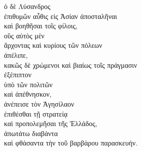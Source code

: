 
{\large
\begin{greek}
\noindent ὁ δὲ Λύσανδρος \\
\tabto{2em} ἐπιθυμῶν αὖθις εἰς Ἀσίαν ἀποσταλῆναι \\
\tabto{4em} καὶ βοηθῆσαι τοῖς φίλοις, \\
\tabto{6em} οὓς αὐτὸς μὲν \\
\tabto{8em} ἄρχοντας καὶ κυρίους τῶν πόλεων \\
\tabto{6em} ἀπέλιπε, \\
\tabto{6em} κακῶς δὲ χρώμενοι καὶ βιαίως τοῖς πράγμασιν \\
\tabto{6em} ἐξέπιπτον \\
\tabto{8em} ὑπὸ τῶν πολιτῶν \\
\tabto{6em} καὶ ἀπέθνησκον, \\
ἀνέπεισε τὸν Ἀγησίλαον \\
\tabto{2em} ἐπιθέσθαι τῇ στρατείᾳ \\
\tabto{2em} καὶ προπολεμῆσαι τῆς  Ἑλλάδος, \\
ἀπωτάτω διαβάντα \\
καὶ φθάσαντα τὴν τοῦ βαρβάρου παρασκευήν.\\

\end{greek}
}

